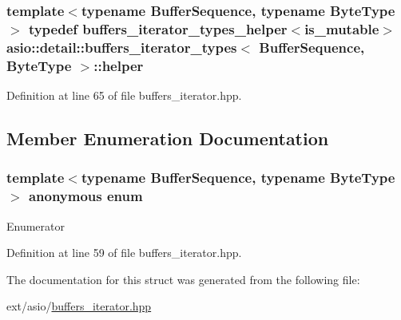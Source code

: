 \subsubsection[{helper}]{\setlength{\rightskip}{0pt plus 5cm}template$<$typename Buffer\+Sequence, typename Byte\+Type$>$ typedef {\bf buffers\+\_\+iterator\+\_\+types\+\_\+helper}$<${\bf is\+\_\+mutable}$>$ {\bf asio\+::detail\+::buffers\+\_\+iterator\+\_\+types}$<$ Buffer\+Sequence, Byte\+Type $>$\+::{\bf helper}}\label{structasio_1_1detail_1_1buffers__iterator__types_ae6a5428132b9db89770ce9bea21a970b}


Definition at line 65 of file buffers\+\_\+iterator.\+hpp.



\subsection{Member Enumeration Documentation}
\hypertarget{structasio_1_1detail_1_1buffers__iterator__types_a4dd87513c54e420b5fcb7d32d9b83066}{}\subsubsection[{anonymous enum}]{\setlength{\rightskip}{0pt plus 5cm}template$<$typename Buffer\+Sequence, typename Byte\+Type$>$ anonymous enum}\label{structasio_1_1detail_1_1buffers__iterator__types_a4dd87513c54e420b5fcb7d32d9b83066}
\begin{Desc}
\item[Enumerator]\par
\begin{description}
\item[{\em 
\hypertarget{structasio_1_1detail_1_1buffers__iterator__types_a4dd87513c54e420b5fcb7d32d9b83066acc55882f3dd7c16702dc2dbc6e626583}{}is\+\_\+mutable\label{structasio_1_1detail_1_1buffers__iterator__types_a4dd87513c54e420b5fcb7d32d9b83066acc55882f3dd7c16702dc2dbc6e626583}
}]\end{description}
\end{Desc}


Definition at line 59 of file buffers\+\_\+iterator.\+hpp.



The documentation for this struct was generated from the following file\+:\begin{DoxyCompactItemize}
\item 
ext/asio/\hyperlink{buffers__iterator_8hpp}{buffers\+\_\+iterator.\+hpp}\end{DoxyCompactItemize}
